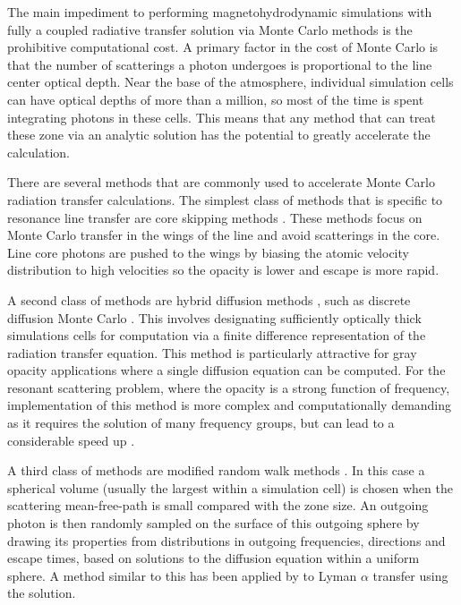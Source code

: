 \documentclass{aastex63}
\begin{document}
The main impediment to performing magnetohydrodynamic simulations with fully a coupled radiative transfer solution via Monte Carlo methods is the prohibitive computational cost. A primary factor in the cost of Monte Carlo is that the number of scatterings a photon undergoes is proportional to the line center optical depth.  Near the base of the atmosphere, individual simulation cells can have optical depths of more than a million, so most of the time is spent integrating photons in these cells. This means that any method that can treat these zone via an analytic solution has the potential to greatly accelerate the calculation.

There are several methods that are commonly used to accelerate Monte Carlo radiation transfer calculations.  The simplest class of methods that is specific to resonance line transfer are core skipping methods \citep{1968ApJ...153..783A,2002ApJ...567..922A}.  These methods focus on Monte Carlo transfer in the wings of the line and avoid scatterings in the core. Line core photons are pushed to the wings by biasing the atomic velocity distribution to high velocities so the opacity is lower and escape is more rapid.

A second class of methods are hybrid diffusion methods \citep{2001JCoPh.172..543G}, such as discrete diffusion Monte Carlo \citep{2007JCoPh.222..485D}. This involves designating sufficiently optically thick simulations cells for computation via a finite difference representation of the radiation transfer equation. This method is particularly attractive for gray opacity applications where a single diffusion equation can be computed.  For the resonant scattering problem, where the opacity is a strong function of frequency, implementation of this method is more complex and computationally demanding as it requires the solution of many frequency groups, but can lead to a considerable speed up \citep{2018MNRAS.479.2065S}.

A third class of methods are modified random walk methods \citep{1984JCoPh..54..508F,2009A&A...497..155M, 2010A&A...520A..70R}. In this case a spherical volume (usually the largest within a simulation cell) is chosen when the scattering mean-free-path is small compared with the zone size.  An outgoing photon is then randomly sampled on the surface of this outgoing sphere by drawing its properties from distributions in outgoing frequencies, directions and escape times, based on solutions to the diffusion equation within a uniform sphere. A method similar to this has been applied by \citet{2006ApJ...645..792T} to Lyman $\alpha$ transfer using the \cite{1990ApJ...350..216N} solution.
\end{document}
